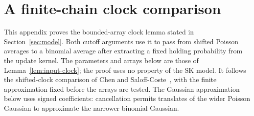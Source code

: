 \section{A finite-chain clock comparison}
\label{app:clock-comparison}

This appendix proves the bounded-array clock lemma stated in
Section~\ref{sec:model}. Both cutoff arguments use it to pass from
shifted Poisson averages to a binomial average after extracting a fixed
holding probability from the update kernel. The parameters and arrays
below are those of Lemma~\ref{lem:input-clock}; the proof uses no
property of the SK model. It follows the shifted-clock comparison of
Chen and Saloff-Coste~\cite[Theorem~1.1 and Lemmas~3.1--3.2]{ChenSaloffCoste2013},
with the finite approximation fixed before the arrays are tested.
The Gaussian approximation below uses signed coefficients: cancellation
permits translates of the wider Poisson Gaussian to approximate the
narrower binomial Gaussian.

